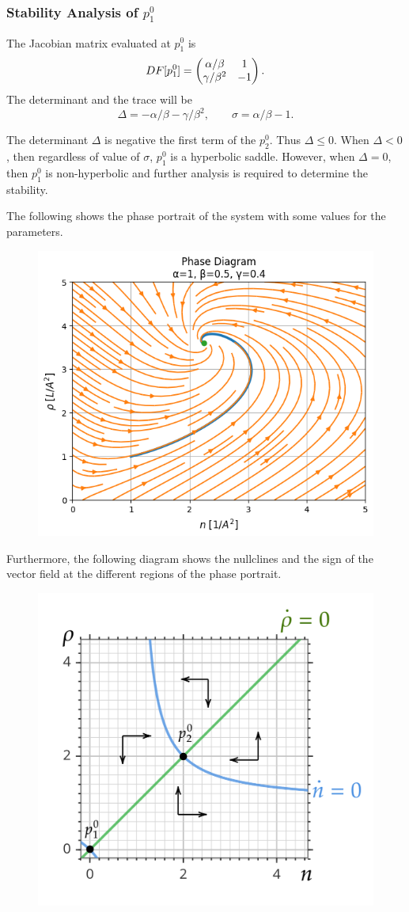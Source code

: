 \subsubsection{Stability Analysis of $p^0_1$}
The Jacobian matrix evaluated at $p^0_1$ is
\[ DF[p^0_1] = \begin{pmatrix} \alpha/\beta & 1 \\ \gamma/\beta^2 & -1 \end{pmatrix}. \]
The determinant and the trace will be
\[  \Delta = -\alpha/\beta - \gamma/\beta^2, \qquad \sigma = \alpha/\beta-1. \]
\begin{observation}
	The determinant $\Delta$ is negative the first term of the $p^0_2$. Thus $\Delta\leq0$. When $\Delta<0$, then regardless of value of $\sigma$, $p^0_1$ is a hyperbolic saddle. However, when $\Delta=0$, then $p^0_1$ is non-hyperbolic and further analysis is required to determine the stability.
\end{observation}
The following shows the phase portrait of the system with some values for the parameters.
\begin{figure}[h!]
	\centering
	\includegraphics[width=0.5\linewidth]{images/simpleODEModel1PhasePortrait}

	\label{fig:simpleodemodel1phaseportrait}
\end{figure}


Furthermore, the following diagram shows the nullclines and the sign of the vector field at the different regions of the phase portrait.
\begin{figure}[h!]
	\centering
	\includegraphics[width=0.5\linewidth]{images/nullClines.png}
	
	\label{fig:simpleodemodel1phaseportrait}
\end{figure}

